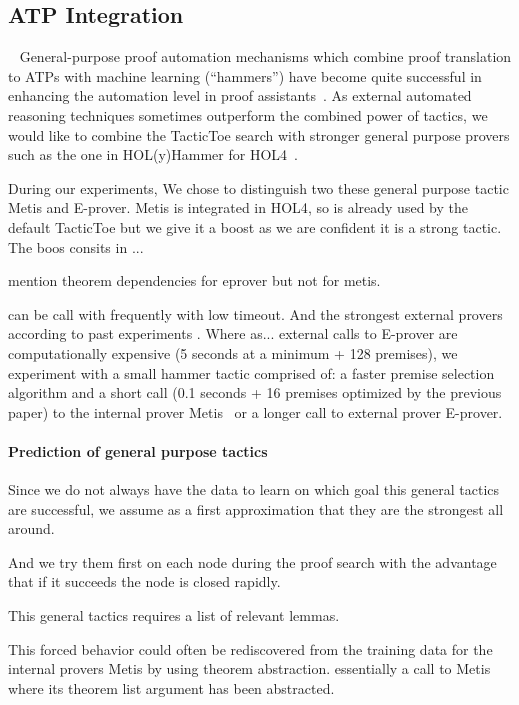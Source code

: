 \documentclass[runningheads,a4paper,draft]{svjour3}
\def\holfour{\textsf{HOL4}\xspace}
\def\eprover{\textsf{E-prover}\xspace}
\def\holyhammer{\textsf{HOL(y)Hammer}\xspace}
\def\metis{\textsf{Metis}\xspace}
\def\tactictoe{\textsf{TacticToe}\xspace}
\begin{document}
\subsection{ATP Integration}~\label{sec:atp}
General-purpose proof automation mechanisms which combine proof translation to
ATPs with machine learning (``hammers'') have become quite successful in
enhancing the automation level in proof assistants~\cite{hammers4qed}.
As external automated reasoning techniques sometimes outperform the combined 
power of tactics, we would like to combine the \tactictoe search with 
stronger general purpose provers such as the one in \holyhammer for 
\holfour~\cite{tgck-cpp15}. 

During our experiments,
We chose to distinguish two these general purpose tactic \metis and \eprover.
\metis is integrated in \holfour, so is already used by the default \tactictoe 
but we give it a boost as we are confident it is a strong tactic. The boos 
consits in ...

mention theorem dependencies for eprover but not for metis.

can be call with frequently with low 
timeout.
And the strongest external provers according to past experiments \cite{tgck-cpp15}.
Where as...
external calls to \eprover are computationally expensive (5 seconds at a 
minimum +  128 premises), we  
experiment with a small hammer tactic comprised of: a faster premise 
selection algorithm and
a short call (0.1 seconds + 16 premises optimized by the previous paper) to the 
internal prover \metis~\cite{metis} or a
longer call to external prover \eprover. 


\paragraph{Prediction of general purpose tactics}
Since we do not always have the data to learn on which goal this general 
tactics are successful, we assume as a first approximation that they are the 
strongest all around. 

And we try them first on each node during the proof search with the advantage 
that if it succeeds the node is closed rapidly.

This general tactics requires a list of relevant lemmas.

This forced behavior could often be rediscovered from the training data for the 
internal provers \metis by using theorem abstraction. essentially a call to 
\metis where its 
theorem list argument has been abstracted.
\end{document}
